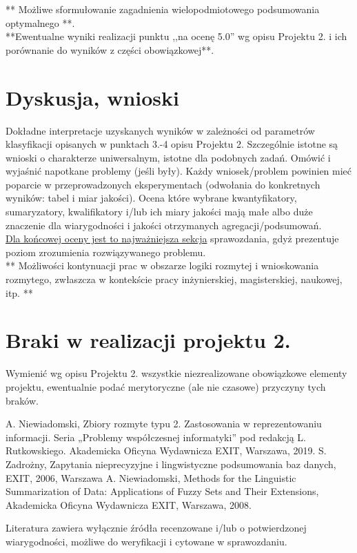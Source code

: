 \documentclass{classrep}
\begin{document}
** Możliwe sformułowanie zagadnienia wielopodmiotowego podsumowania optymalnego **.\\

{**Ewentualne wyniki realizacji punktu ,,na ocenę 5.0'' wg opisu Projektu 2. i ich porównanie do wyników z
części obowiązkowej**.}\\



\section{Dyskusja, wnioski}
Dokładne interpretacje uzyskanych wyników w zależności od parametrów klasyfikacji
opisanych w punktach 3.-4 opisu Projektu 2. 
Szczególnie istotne są wnioski o charakterze uniwersalnym, istotne dla podobnych zadań. 
Omówić i wyjaśnić napotkane problemy (jeśli były). Każdy wniosek/problem powinien mieć poparcie
w przeprowadzonych eksperymentach (odwołania do konkretnych wyników: tabel i miar
jakości). Ocena które wybrane kwantyfikatory, sumaryzatory, kwalifikatory i/lub ich
miary jakości mają małe albo duże znaczenie dla wiarygodności i jakości otrzymanych
agregacji/podsumowań.  \\
\underline{Dla końcowej oceny jest to najważniejsza sekcja} sprawozdania, gdyż prezentuje poziom
zrozumienia rozwiązywanego problemu.\\

** Możliwości kontynuacji prac w obszarze logiki rozmytej i wnioskowania rozmytego, zwłaszcza w kontekście pracy inżynierskiej,
magisterskiej, naukowej, itp. **\\



\section{Braki w realizacji projektu 2.}
Wymienić wg opisu Projektu 2. wszystkie niezrealizowane obowiązkowe elementy projektu, ewentualnie
podać merytoryczne (ale nie czasowe) przyczyny tych braków. 


\begin{thebibliography}{99}
  A. Niewiadomski, Zbiory rozmyte typu 2. Zastosowania w reprezentowaniu informacji.  Seria „Problemy współczesnej informatyki” pod redakcją L. Rutkowskiego. Akademicka Oficyna Wydawnicza EXIT, Warszawa, 2019.
 S. Zadrożny, Zapytania nieprecyzyjne i lingwistyczne podsumowania baz danych, EXIT, 2006, Warszawa
 A. Niewiadomski, Methods for the Linguistic Summarization of Data: Applications of Fuzzy Sets and Their Extensions, Akademicka Oficyna Wydawnicza EXIT, Warszawa, 2008.
\end{thebibliography}

Literatura zawiera wyłącznie źródła recenzowane i/lub o potwierdzonej wiarygodności,
możliwe do weryfikacji i cytowane w sprawozdaniu. 
\end{document}
